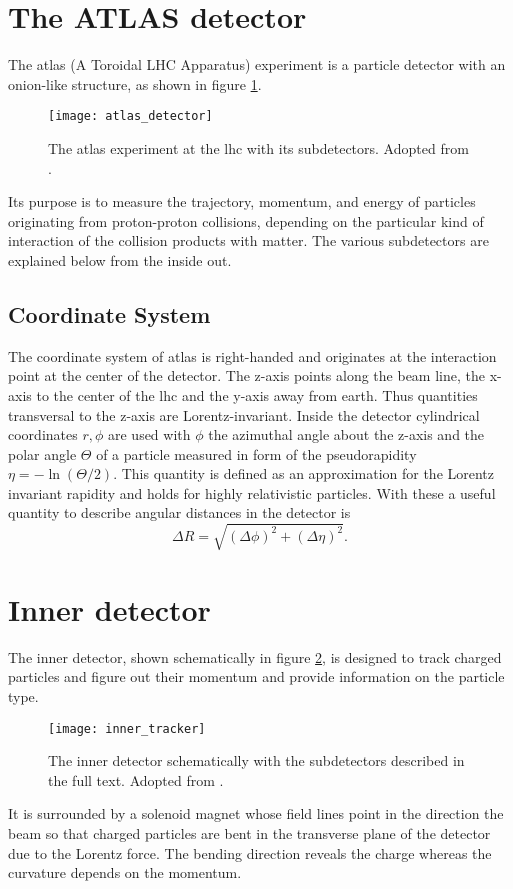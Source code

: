 \section{The ATLAS detector}
The \ac{atlas} (A Toroidal LHC Apparatus) experiment is a particle detector with an onion-like structure, as shown in figure \ref{fig:atlas_detector}.
\begin{figure}
    \centering
    \texttt{[image: atlas\_detector]}
    \caption[]{The \ac{atlas} experiment at the \ac{lhc} with its subdetectors. Adopted from \citep{Pequenao:1095924}.}
    \label{fig:atlas_detector}
\end{figure}
Its purpose is to measure the trajectory, momentum, and energy of particles originating from proton-proton collisions, depending on the particular kind of interaction of the collision products with matter. The various subdetectors are explained below from the inside out.

\subsection*{Coordinate System}
The coordinate system of \ac{atlas} is right-handed and originates at the interaction point at the center of the detector. The z-axis points along the beam line, the x-axis to the center of the lhc and the y-axis away from earth. Thus quantities transversal to the z-axis are Lorentz-invariant. Inside the detector cylindrical coordinates $r,\phi$ are used with $\phi$ the azimuthal angle about the z-axis and the polar angle $\Theta$ of a particle measured in form of the pseudorapidity $\eta=-\ln(\Theta/2)$. This quantity is defined as an approximation for the Lorentz invariant rapidity and holds for highly relativistic particles. With these a useful quantity to describe angular distances in the detector is
\begin{equation}
    \Delta R = \sqrt{(\Delta\phi)^2+(\Delta \eta)^2}.
    \label{eq:delta_R}
\end{equation}

\section{Inner detector}\label{sec:inner_detector}
The inner detector, shown schematically in figure \ref{fig:inner_tracker}, is designed to track charged particles and figure out their momentum and provide information on the particle type.
\begin{figure}
    \centering
    \texttt{[image: inner\_tracker]}
    \caption[]{The inner detector schematically with the subdetectors described in the full text. Adopted from \citep{Potamianos:2016ptf}.}
    \label{fig:inner_tracker}
\end{figure}
It is surrounded by a solenoid magnet whose field lines point in the direction the beam so that charged particles are bent in the transverse plane of the detector due to the Lorentz force. The bending direction reveals the charge whereas the curvature depends on the momentum.

